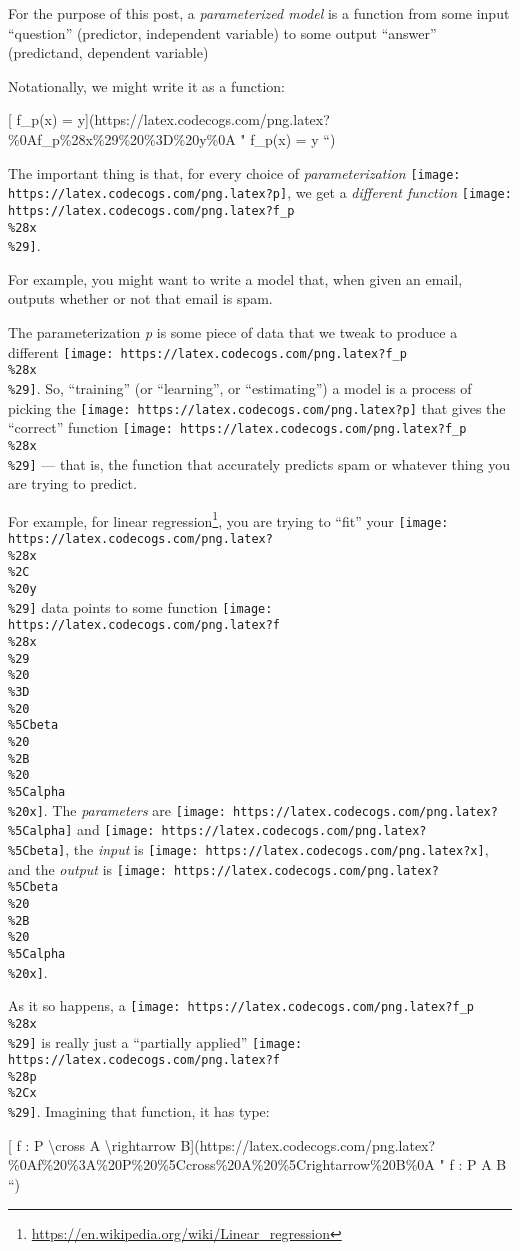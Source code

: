 \documentclass[]{article}
\renewcommand{\href}[2]{#2\footnote{\url{#1}}}
\begin{document}
For the purpose of this post, a \emph{parameterized model} is a function from
some input ``question'' (predictor, independent variable) to some output
``answer'' (predictand, dependent variable)

Notationally, we might write it as a function:

{[} f\_p(x) =
y{]}(https://latex.codecogs.com/png.latex?\%0Af\_p\%28x\%29\%20\%3D\%20y\%0A "
f\_p(x) = y ``)

The important thing is that, for every choice of \emph{parameterization}
\texttt{[image: https://latex.codecogs.com/png.latex?p]}, we get a
\emph{different function}
\texttt{[image: https://latex.codecogs.com/png.latex?f\_p\\\%28x\\\%29]}.

For example, you might want to write a model that, when given an email, outputs
whether or not that email is spam.

The parameterization \emph{p} is some piece of data that we tweak to produce a
different \texttt{[image: https://latex.codecogs.com/png.latex?f\_p\\\%28x\\\%29]}.
So, ``training'' (or ``learning'', or ``estimating'') a model is a process of
picking the \texttt{[image: https://latex.codecogs.com/png.latex?p]} that gives
the ``correct'' function
\texttt{[image: https://latex.codecogs.com/png.latex?f\_p\\\%28x\\\%29]} --- that is,
the function that accurately predicts spam or whatever thing you are trying to
predict.

For example, for \href{https://en.wikipedia.org/wiki/Linear_regression}{linear
regression}, you are trying to ``fit'' your
\texttt{[image: https://latex.codecogs.com/png.latex?\\\%28x\\\%2C\\\%20y\\\%29]} data
points to some function
\texttt{[image: https://latex.codecogs.com/png.latex?f\\\%28x\\\%29\\\%20\\\%3D\\\%20\\\%5Cbeta\\\%20\\\%2B\\\%20\\\%5Calpha\\\%20x]}.
The \emph{parameters} are
\texttt{[image: https://latex.codecogs.com/png.latex?\\\%5Calpha]} and
\texttt{[image: https://latex.codecogs.com/png.latex?\\\%5Cbeta]}, the
\emph{input} is \texttt{[image: https://latex.codecogs.com/png.latex?x]}, and
the \emph{output} is
\texttt{[image: https://latex.codecogs.com/png.latex?\\\%5Cbeta\\\%20\\\%2B\\\%20\\\%5Calpha\\\%20x]}.

As it so happens, a
\texttt{[image: https://latex.codecogs.com/png.latex?f\_p\\\%28x\\\%29]} is really
just a ``partially applied''
\texttt{[image: https://latex.codecogs.com/png.latex?f\\\%28p\\\%2Cx\\\%29]}.
Imagining that function, it has type:

{[} f : P \textbackslash{}cross A \textbackslash{}rightarrow
B{]}(https://latex.codecogs.com/png.latex?\%0Af\%20\%3A\%20P\%20\%5Ccross\%20A\%20\%5Crightarrow\%20B\%0A
" f : P \cross A \rightarrow B ``)
\end{document}
